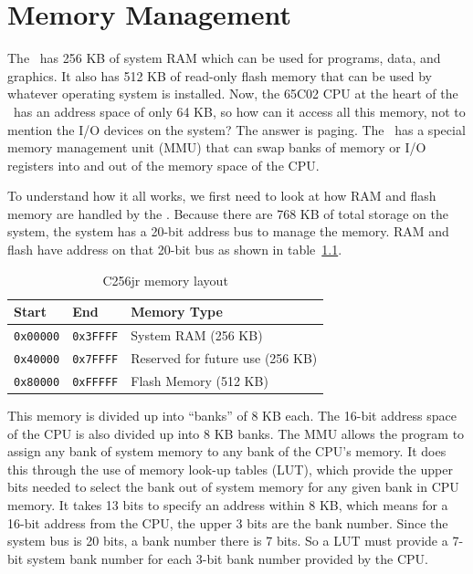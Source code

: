 \chapter{Memory Management}

The \jr\ has 256 KB of system RAM which can be used for programs, data, and graphics. It also has 512 KB of read-only flash memory that can be used by whatever operating system is installed. Now, the 65C02 CPU at the heart of the \jr\ has an address space of only 64 KB, so how can it access all this memory, not to mention the I/O devices on the system? The answer is paging. The \jr\ has a special memory management unit (MMU) that can swap banks of memory or I/O registers into and out of the memory space of the CPU.

To understand how it all works, we first need to look at how RAM and flash memory are handled by the \jr. Because there are 768 KB of total storage on the system, the system has a 20-bit address bus to manage the memory. RAM and flash have address on that 20-bit bus as shown in table~\ref{tab:memory}.

\begin{table}[h]
	\begin{center}
		\begin{tabular}{| l | l | l |} \hline
			Start & End & Memory Type \\ \hline\hline
		  	\verb+0x00000+ & \verb+0x3FFFF+ & System RAM (256 KB)\\ \hline
			\verb+0x40000+ & \verb+0x7FFFF+ & Reserved for future use (256 KB)\\ \hline
		  	\verb+0x80000+ & \verb+0xFFFFF+ & Flash Memory (512 KB) \\ \hline
		\end{tabular}
	\end{center}
	\caption{C256jr memory layout}
	\label{tab:memory}
\end{table}

This memory is divided up into ``banks'' of 8 KB each. The 16-bit address space of the CPU is also divided up into 8 KB banks. The MMU allows the program to assign any bank of system memory to any bank of the CPU's memory. It does this through the use of memory look-up tables (LUT), which provide the upper bits needed to select the bank out of system memory for any given bank in CPU memory. It takes 13 bits to specify an address within 8 KB, which means for a 16-bit address from the CPU, the upper 3 bits are the bank number. Since the system bus is 20 bits, a bank number there is 7 bits. So a LUT must provide a 7-bit system bank number for each 3-bit bank number provided by the CPU.

